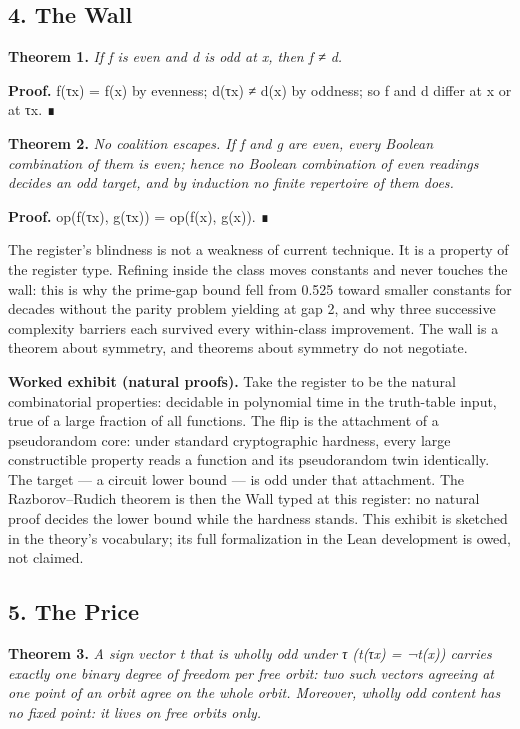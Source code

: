 \documentclass[10pt]{article}
\renewcommand{\_}{\origunderscore\allowbreak}
\begin{document}
\hypertarget{the-wall}{%
\subsection{4. The Wall}\label{the-wall}}

\textbf{Theorem 1.} \emph{If f is even and d is odd at x, then f ≠ d.}

\textbf{Proof.} f(τx) = f(x) by evenness; d(τx) ≠ d(x) by oddness; so f
and d differ at x or at τx. ∎

\textbf{Theorem 2.} \emph{No coalition escapes. If f and g are even,
every Boolean combination of them is even; hence no Boolean combination
of even readings decides an odd target, and by induction no finite
repertoire of them does.}

\textbf{Proof.} op(f(τx), g(τx)) = op(f(x), g(x)). ∎

The register's blindness is not a weakness of current technique. It is a
property of the register type. Refining inside the class moves constants
and never touches the wall: this is why the prime-gap bound fell from
0.525 toward smaller constants for decades without the parity problem
yielding at gap 2, and why three successive complexity barriers each
survived every within-class improvement. The wall is a theorem about
symmetry, and theorems about symmetry do not negotiate.

\textbf{Worked exhibit (natural proofs).} Take the register to be the
natural combinatorial properties: decidable in polynomial time in the
truth-table input, true of a large fraction of all functions. The flip
is the attachment of a pseudorandom core: under standard cryptographic
hardness, every large constructible property reads a function and its
pseudorandom twin identically. The target --- a circuit lower bound ---
is odd under that attachment. The Razborov--Rudich theorem is then the
Wall typed at this register: no natural proof decides the lower bound
while the hardness stands. This exhibit is sketched in the theory's
vocabulary; its full formalization in the Lean development is owed, not
claimed.

\hypertarget{the-price}{%
\subsection{5. The Price}\label{the-price}}

\textbf{Theorem 3.} \emph{A sign vector t that is wholly odd under τ
(t(τx) = ¬t(x)) carries exactly one binary degree of freedom per free
orbit: two such vectors agreeing at one point of an orbit agree on the
whole orbit. Moreover, wholly odd content has no fixed point: it lives
on free orbits only.}
\end{document}
